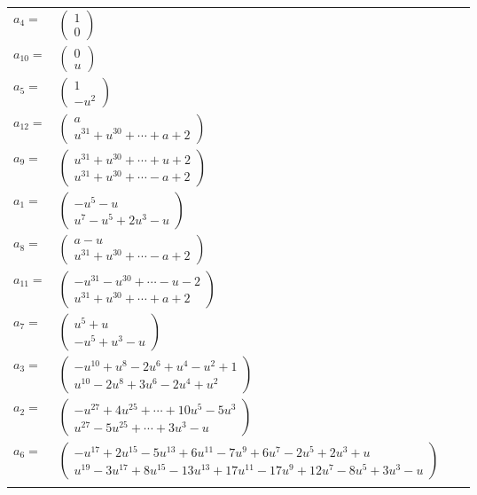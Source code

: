 \documentclass[1p]{elsarticle_modified}
\theoremstyle{definition}
\begin{document}
\begin{tabular}{m{7pt} m{180pt} m{7pt} m{180pt} }
\flushright $a_{4}=$&$\begin{pmatrix}1\\0\end{pmatrix}$ \\
\flushright $a_{10}=$&$\begin{pmatrix}0\\u\end{pmatrix}$ \\
\flushright $a_{5}=$&$\begin{pmatrix}1\\- u^2\end{pmatrix}$ \\
\flushright $a_{12}=$&$\begin{pmatrix}a\\u^{31}+u^{30}+\cdots+a+2\end{pmatrix}$ \\
\flushright $a_{9}=$&$\begin{pmatrix}u^{31}+u^{30}+\cdots+u+2\\u^{31}+u^{30}+\cdots- a+2\end{pmatrix}$ \\
\flushright $a_{1}=$&$\begin{pmatrix}- u^5- u\\u^7- u^5+2 u^3- u\end{pmatrix}$ \\
\flushright $a_{8}=$&$\begin{pmatrix}a- u\\u^{31}+u^{30}+\cdots- a+2\end{pmatrix}$ \\
\flushright $a_{11}=$&$\begin{pmatrix}- u^{31}- u^{30}+\cdots- u-2\\u^{31}+u^{30}+\cdots+a+2\end{pmatrix}$ \\
\flushright $a_{7}=$&$\begin{pmatrix}u^5+u\\- u^5+u^3- u\end{pmatrix}$ \\
\flushright $a_{3}=$&$\begin{pmatrix}- u^{10}+u^8-2 u^6+u^4- u^2+1\\u^{10}-2 u^8+3 u^6-2 u^4+u^2\end{pmatrix}$ \\
\flushright $a_{2}=$&$\begin{pmatrix}- u^{27}+4 u^{25}+\cdots+10 u^5-5 u^3\\u^{27}-5 u^{25}+\cdots+3 u^3- u\end{pmatrix}$ \\
\flushright $a_{6}=$&$\begin{pmatrix}- u^{17}+2 u^{15}-5 u^{13}+6 u^{11}-7 u^9+6 u^7-2 u^5+2 u^3+u\\u^{19}-3 u^{17}+8 u^{15}-13 u^{13}+17 u^{11}-17 u^9+12 u^7-8 u^5+3 u^3- u\end{pmatrix}$\\&\end{tabular}
\end{document}
